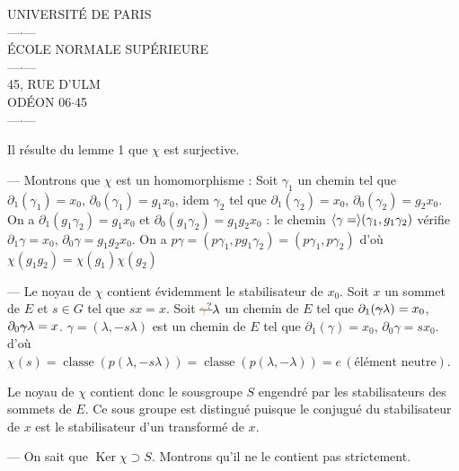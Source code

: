 

\begin{center}
UNIVERSITÉ DE PARIS\\
---$\cdot$---\\
ÉCOLE NORMALE SUPÉRIEURE\\
---$\cdot$---\\
45, RUE D'ULM\\
ODÉON 06$\cdot$45\\
---$\cdot$---
\end{center}

Il résulte du lemme 1 que $\chi$ est surjective.

--- Montrons que $\chi$ est  un homomorphisme :  Soit $\gamma_1$ un  chemin tel que $\partial_1(\gamma_1)=x_0$, $\partial_0(\gamma_1)=g_1x_0$, idem  $\gamma_2$ tel que $\partial_1(\gamma_2)=x_0$, $\partial_0(\gamma_2)=g_2x_0$. On a $\partial_1(g_1\gamma_2)=g_1x_0$ et $\partial_0(g_1\gamma_2)=g_1g_2x_0$ : le chemin $\inserted{\gamma=}(\gamma_1,g_1\gamma_2)$ vérifie $\partial_1\gamma=x_0$, $\partial_0\gamma=g_1g_2x_0$.  On a $p\gamma=(p\gamma_1,pg_1\gamma_2)=(p\gamma_1,p\gamma_2)$  d'où $\chi(g_1g_2)=\chi(g_1)\chi(g_2)$

--- Le noyau de $\chi$ contient évidemment le stabilisateur de $x_0$. Soit $x$ un sommet de $E$ et $s\in G$ tel que $sx=x$. Soit $\deleted{\unsure{\gamma}}\lambda$ un chemin de $E$ tel que $\partial_1(\deleted{\gamma}\lambda)=x_0$, $\partial_0\deleted{\gamma}\lambda=x$.  $\gamma=(\lambda,-s\lambda)$ est un chemin de $E$ tel que $\partial_1(\gamma)=x_0$, $\partial_0\gamma=sx_0$. d'où $\chi(s)=\operatorname{classe}(p(\lambda,-s\lambda))=\operatorname{classe}(p(\lambda,-\lambda))=e\,(\text{élément neutre})$.

Le noyau de $\chi$ contient donc le sousgroupe $S$  engendré par les stabilisateurs des  sommets de $E$. Ce sous groupe est distingué puisque le conjugué du stabilisateur de $x$ est le stabilisateur d'un transformé de $x$.

--- On sait que $\operatorname{Ker}\chi\supset S$. Montrons qu'il ne le contient pas strictement.

